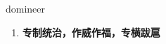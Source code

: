 
\begin{frame}
{\huge domineer}
\begin{center}
\begin{enumerate}\Large
  \item \textbf{专制统治，作威作福，专横跋扈}
\end{enumerate}
\end{center}
\end{frame}

